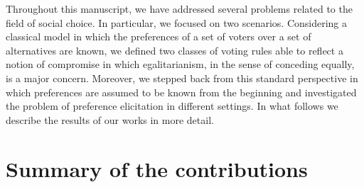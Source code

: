 
Throughout this manuscript, we have addressed several problems related to the field of social choice. In particular, we focused on two scenarios. 
Considering a classical model in which the preferences of a set of voters over a set of alternatives are known, we defined two classes of voting rules able to reflect a notion of compromise in which egalitarianism, in the sense of conceding equally, is a major concern.
Moreover, we stepped back from this standard perspective in which preferences are assumed to be known from the beginning and investigated the problem of preference elicitation in different settings. In what follows we describe the results of our works in more detail.

\section{Summary of the contributions}

